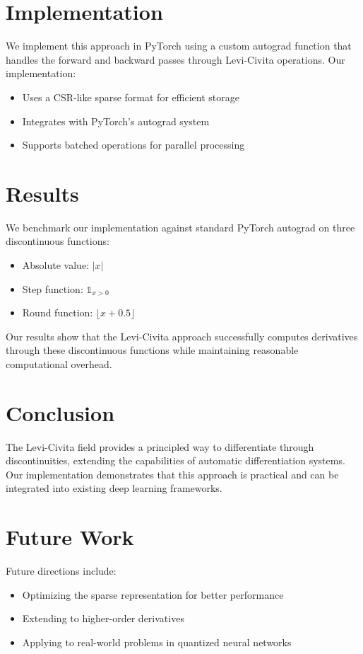 \documentclass{article}
\begin{document}
\section{Implementation}
We implement this approach in PyTorch using a custom autograd function that handles the forward and backward passes through Levi-Civita operations. Our implementation:
\begin{itemize}
    \item Uses a CSR-like sparse format for efficient storage
    \item Integrates with PyTorch's autograd system
    \item Supports batched operations for parallel processing
\end{itemize}

\section{Results}
We benchmark our implementation against standard PyTorch autograd on three discontinuous functions:
\begin{itemize}
    \item Absolute value: \(|x|\)
    \item Step function: \(\mathbb{1}_{x > 0}\)
    \item Round function: \(\lfloor x + 0.5 \rfloor\)
\end{itemize}

Our results show that the Levi-Civita approach successfully computes derivatives through these discontinuous functions while maintaining reasonable computational overhead.

\section{Conclusion}
The Levi-Civita field provides a principled way to differentiate through discontinuities, extending the capabilities of automatic differentiation systems. Our implementation demonstrates that this approach is practical and can be integrated into existing deep learning frameworks.

\section{Future Work}
Future directions include:
\begin{itemize}
    \item Optimizing the sparse representation for better performance
    \item Extending to higher-order derivatives
    \item Applying to real-world problems in quantized neural networks
\end{itemize}
\end{document}
